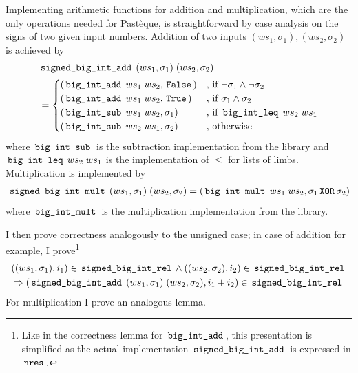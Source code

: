 Implementing arithmetic functions for addition and multiplication, which are the only operations needed for Pastèque, is straightforward by case analysis on the signs of two given input numbers.
Addition of two inputs $(ws_1,\sigma_1), (ws_2,\sigma_2)$ is achieved by
\begin{align*}
	 & \,\text{\ttfamily signed\_big\_int\_add}\, \; (ws_1,\sigma_1) \; (ws_2,\sigma_2)                                                                                                     \\
	 & = \begin{cases}
		     (\,\text{\ttfamily big\_int\_add}\, \; ws_1 \; ws_2,\,\text{\ttfamily False}\,) & \text{, if $\lnot \sigma_1 \land \lnot \sigma_2$}                                                              \\
		     (\,\text{\ttfamily big\_int\_add}\, \; ws_1 \; ws_2,\,\text{\ttfamily True}\,)  & \text{, if $\sigma_1 \land \sigma_2$}                                                                          \\
		     (\,\text{\ttfamily big\_int\_sub}\, \; ws_1 \; ws_2,\sigma_1)     & \text{, if $\,\text{\ttfamily big\_int\_leq}\, \; ws_2 \; ws_1$} \\
		     (\,\text{\ttfamily big\_int\_sub}\, \; ws_2 \; ws_1,\sigma_2)     & \text{, otherwise}
	     \end{cases}
\end{align*}
where $\,\text{\ttfamily big\_int\_sub}\,$ is the subtraction implementation from the library and $\,\text{\ttfamily big\_int\_leq}\, \; ws_2 \; ws_1$ is the implementation of $\leq$ for lists of limbs.
Multiplication is implemented by
\begin{gather*}
	\,\text{\ttfamily signed\_big\_int\_mult}\, \; (ws_1,\sigma_1) \; (ws_2,\sigma_2) = (\,\text{\ttfamily big\_int\_mult}\, \; ws_1 \; ws_2, \sigma_1 \,\text{\ttfamily XOR}\, \sigma_2)
\end{gather*}
where $\,\text{\ttfamily big\_int\_mult}\,$ is the multiplication implementation from the library.

I then prove correctness analogously to the unsigned case; in case of addition for example, I prove\footnote{
    Like in the correctness lemma for $\,\text{\ttfamily big\_int\_add}\,$, this presentation is simplified as the actual implementation $\,\text{\ttfamily signed\_big\_int\_add}\,$ is expressed in $\,\text{\ttfamily nres}\,$.
}
\begin{gather*}
	((ws_1,\sigma_1),i_1) \in \,\text{\ttfamily signed\_big\_int\_rel}\, \land ((ws_2,\sigma_2),i_2) \in \,\text{\ttfamily signed\_big\_int\_rel}\, \\
	\Rightarrow (\,\text{\ttfamily signed\_big\_int\_add}\, \; (ws_1,\sigma_1) \; (ws_2,\sigma_2), i_1 + i_2) \in \,\text{\ttfamily signed\_big\_int\_rel}\,
\end{gather*}
For multiplication I prove an analogous lemma.

